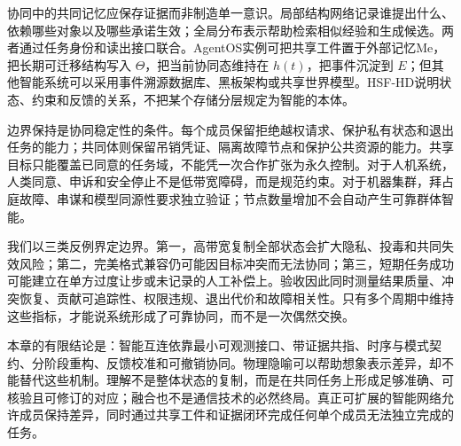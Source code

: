 协同中的共同记忆应保存证据而非制造单一意识。局部结构网络记录谁提出什么、依赖哪些对象以及哪些承诺生效；全局分布表示帮助检索相似经验和生成候选。两者通过任务身份和读出接口联合。AgentOS实例可把共享工件置于外部记忆Me，把长期可迁移结构写入 $\Theta$，把当前协同态维持在 $h(t)$，把事件沉淀到 $E$；但其他智能系统可以采用事件溯源数据库、黑板架构或共享世界模型。HSF-HD说明状态、约束和反馈的关系，不把某个存储分层规定为智能的本体。

边界保持是协同稳定性的条件。每个成员保留拒绝越权请求、保护私有状态和退出任务的能力；共同体则保留吊销凭证、隔离故障节点和保护公共资源的能力。共享目标只能覆盖已同意的任务域，不能凭一次合作扩张为永久控制。对于人机系统，人类同意、申诉和安全停止不是低带宽障碍，而是规范约束。对于机器集群，拜占庭故障、串谋和模型同源性要求独立验证；节点数量增加不会自动产生可靠群体智能。

我们以三类反例界定边界。第一，高带宽复制全部状态会扩大隐私、投毒和共同失效风险；第二，完美格式兼容仍可能因目标冲突而无法协同；第三，短期任务成功可能建立在单方过度让步或未记录的人工补偿上。验收因此同时测量结果质量、冲突恢复、贡献可追踪性、权限违规、退出代价和故障相关性。只有多个周期中维持这些指标，才能说系统形成了可靠协同，而不是一次偶然交换。

本章的有限结论是：智能互连依靠最小可观测接口、带证据共指、时序与模式契约、分阶段重构、反馈校准和可撤销协同。物理隐喻可以帮助想象表示差异，却不能替代这些机制。理解不是整体状态的复制，而是在共同任务上形成足够准确、可核验且可修订的对应；融合也不是通信技术的必然终局。真正可扩展的智能网络允许成员保持差异，同时通过共享工件和证据闭环完成任何单个成员无法独立完成的任务。

